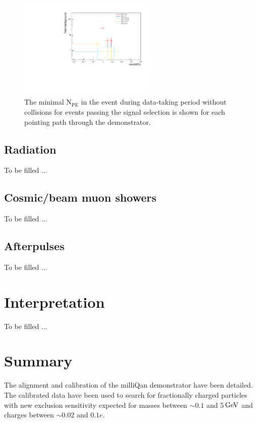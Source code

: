 \documentclass[12pt]{article}
\newcommand{\unit}[1]{\ensuremath{\text{\,#1}}\xspace}
\newcommand{\npe} {\mbox{\ensuremath{\textrm{N}_\textrm{PE}}}\xspace}
\begin{document}

\begin{figure}[ht!]
    \centering
    \includegraphics[width=0.6\textwidth]{figures/perPathPlotsNoBeam.pdf}
    \caption{\label{fig:perPathPlot} The minimal \npe in the event during data-taking period without
    collisions for events passing the signal selection is shown for each pointing path 
    through the demonstrator.}
\end{figure}

\subsection{Radiation}

To be filled ...

\subsection{Cosmic/beam muon showers}

To be filled ...

\subsection{Afterpulses}

To be filled ...

\section{Interpretation}

To be filled ...

\section{Summary}

The alignment and calibration of the milliQan demonstrator have been detailed. The calibrated
data have been used to search for fractionally charged particles with new 
exclusion sensitivity expected for masses between $\sim0.1$ and 5\unit{GeV} 
and charges between $\sim0.02$ and $0.1e$.
\end{document}
